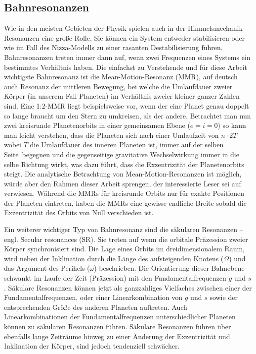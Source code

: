 \documentclass[12pt,a4paper,twoside]{article}
\renewcommand{\cite}{\citep}
\begin{document}
\subsection{Bahnresonanzen}
Wie in den meisten Gebieten der Physik spielen auch in der Himmelsmechanik Resonanzen eine große Rolle. Sie können ein System entweder stabilisieren oder wie im Fall des Nizza-Modells zu einer rasanten Destabilisierung führen.
Bahnresonanzen treten immer dann auf, wenn zwei Frequenzen eines Systems ein bestimmtes Verhältnis haben.
Die einfachst zu Verstehende und für diese Arbeit wichtigste Bahnresonanz ist die Mean-Motion-Resonanz (MMR), auf deutsch auch Resonanz der mittleren Bewegung, bei welche die Umlaufdauer zweier Körper (in unserem Fall Planeten) im Verhältnis zweier kleiner ganzer Zahlen sind.
Eine 1:2-MMR liegt beispielsweise vor, wenn der eine Planet genau doppelt so lange braucht um den Stern zu umkreisen, als der andere. Betrachtet man nun zwei kreisrunde Planetenorbits in einer gemeinsamen Ebene ($e=i=0$) so kann man leicht verstehen, dass die Planeten sich nach einer Umlaufzeit von $n\cdot 2T$ wobei $T$ die Umlaufdauer des inneren Planeten ist, immer auf der \glqq selben Seite\grqq\ begegnen und die gegenseitige gravitative Wechselwirkung immer in die selbe Richtung wirkt, was dazu führt, dass die Exzentrizität der Planetenorbits steigt.
Die analytische Betrachtung von Mean-Motion-Resonanzen ist möglich, würde aber den Rahmen dieser Arbeit sprengen, der interessierte Leser sei auf \cite{Dvorak2005} verwiesen. %
Während die MMRs für kreisrunde Orbits nur für exakte Positionen der Planeten eintreten, haben die MMRs eine gewisse endliche Breite sobald die Exzentrizität des Orbits von Null verschieden ist.

Ein weiterer wichtiger Typ von Bahnresonanz sind die säkularen Resonanzen – engl. Secular resonances (SR). Sie treten auf wenn die orbitale Präzession zweier Körper synchronisiert sind. %
Die Lage eines Orbits im dreidimensionalem Raum, wird neben der Inklination durch die Länge des aufsteigenden Knotens ($\Omega$) und das Argument des Perihels ($\omega$) beschrieben. Die Orientierung dieser Bahnebene schwankt im Laufe der Zeit (Präzession) mit den Fundamentalfrequenzen $g$ und $s$. Säkulare Resonanzen können jetzt als ganzzahliges Vielfaches zwischen einer der Fundamentalfrequenzen, oder einer Linearkombination von $g$ und $s$ sowie der entsprechenden Größe des anderen Planeten auftreten. Auch Linearkombinationen der Fundamentalfrequenzen unterschiedlicher Planeten können zu säkularen Resonanzen führen.
Säkulare Resonanzen führen über ebenfalls lange Zeiträume hinweg zu einer Änderung der Exzentrizität und Inklination der Körper, sind jedoch tendenziell schwächer.
\end{document}
